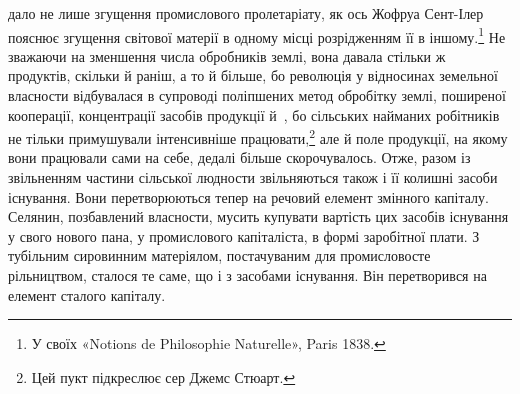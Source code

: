 \parcont{}  %
дало не лише згущення промислового пролетаріату, як ось Жофруа
Сент-Ілер пояснює згущення світової матерії в одному
місці розрідженням її в іншому.\footnote{
У своїх «Notions de Philosophie Naturelle», Paris 1838.
} Не зважаючи на зменшення
числа обробників землі, вона давала стільки ж продуктів, скільки
й раніш, а то й більше, бо революція у відносинах земельної
власности відбувалася в супроводі поліпшених метод обробітку
землі, поширеної кооперації, концентрації засобів продукції й~, бо сільських найманих робітників не тільки примушували
інтенсивніше працювати,\footnote{
Цей пукт підкреслює сер Джемс Стюарт.
} але й поле продукції, на якому
вони працювали сами на себе, дедалі більше скорочувалось.
Отже, разом із звільненням частини сільської людности звільняються
також і її колишні засоби існування. Вони перетворюються
тепер на речовий елемент змінного капіталу. Селянин,
позбавлений власности, мусить купувати вартість цих засобів
існування у свого нового пана, у промислового капіталіста, в
формі заробітної плати. З тубільним сировинним матеріялом,
постачуваним для промисловосте рільництвом, сталося те саме,
що і з засобами існування. Він перетворився на елемент сталого
капіталу.

